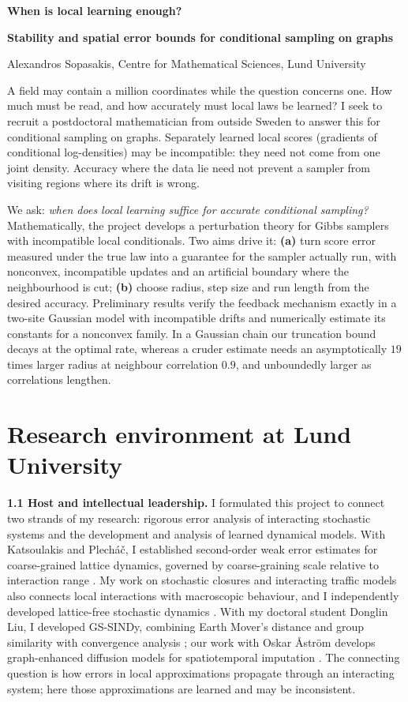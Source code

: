 \documentclass[12pt,a4paper]{article}
\begin{document}
{\LARGE\bfseries When is local learning enough?\par}
\vspace{3pt}
{\large\bfseries Stability and spatial error bounds for conditional sampling on graphs\par}
\vspace{4pt}
Alexandros Sopasakis, Centre for Mathematical Sciences, Lund University

A field may contain a million coordinates while the question concerns one. How much must be read, and how accurately must local laws be learned? I seek to recruit a postdoctoral mathematician from outside Sweden to answer this for conditional sampling on graphs. Separately learned local scores (gradients of conditional log-densities) may be incompatible: they need not come from one joint density. Accuracy where the data lie need not prevent a sampler from visiting regions where its drift is wrong.

We ask: \emph{when does local learning suffice for accurate conditional sampling?} Mathematically, the project develops a perturbation theory for Gibbs samplers with incompatible local conditionals. Two aims drive it: \textbf{(a)} turn score error measured under the true law into a guarantee for the sampler actually run, with nonconvex, incompatible updates and an artificial boundary where the neighbourhood is cut; \textbf{(b)} choose radius, step size and run length from the desired accuracy. Preliminary results verify the feedback mechanism exactly in a two-site Gaussian model with incompatible drifts and numerically estimate its constants for a nonconvex family. In a Gaussian chain our truncation bound decays at the optimal rate, whereas a cruder estimate needs an asymptotically $19$ times larger radius at neighbour correlation $0.9$, and unboundedly larger as correlations lengthen.

\section{Research environment at Lund University}
\textbf{1.1 Host and intellectual leadership.}
I formulated this project to connect two strands of my research: rigorous error analysis of interacting stochastic systems and the development and analysis of learned dynamical models. With Katsoulakis and Plech\'a\v{c}, I established second-order weak error estimates for coarse-grained lattice dynamics, governed by coarse-graining scale relative to interaction range \cite{KPS06}. My work on stochastic closures \cite{KMS05} and interacting traffic models \cite{SK06} also connects local interactions with macroscopic behaviour, and I independently developed lattice-free stochastic dynamics \cite{Sop12}. With my doctoral student Donglin Liu, I developed GS-SINDy, combining Earth Mover's distance and group similarity with convergence analysis \cite{LS25}; our work with Oskar \AA{}str\"om develops graph-enhanced diffusion models for spatiotemporal imputation \cite{LAS25}. The connecting question is how errors in local approximations propagate through an interacting system; here those approximations are learned and may be inconsistent.
\end{document}
